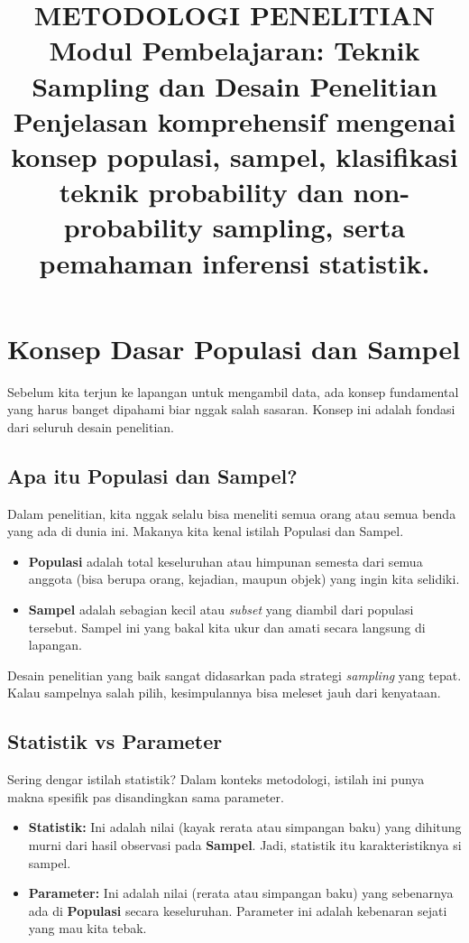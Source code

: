 \documentclass[12pt,a4paper]{article}
\title{
  {\LARGE\bfseries METODOLOGI PENELITIAN}\\[0.5em]
  {\large Modul Pembelajaran: Teknik Sampling dan Desain Penelitian}\\[0.8em]
  {\normalsize Penjelasan komprehensif mengenai konsep populasi, sampel, klasifikasi teknik probability dan non-probability sampling, serta pemahaman inferensi statistik.}
}
\author{}
\date{}
\begin{document}
\maketitle
\thispagestyle{fancy}
\tableofcontents
\newpage


\section{Konsep Dasar Populasi dan Sampel}

Sebelum kita terjun ke lapangan untuk mengambil data, ada konsep fundamental yang harus banget dipahami biar nggak salah sasaran. Konsep ini adalah fondasi dari seluruh desain penelitian.

\subsection{Apa itu Populasi dan Sampel?}
Dalam penelitian, kita nggak selalu bisa meneliti semua orang atau semua benda yang ada di dunia ini. Makanya kita kenal istilah Populasi dan Sampel.
\begin{itemize}
    \item \textbf{Populasi} adalah total keseluruhan atau himpunan semesta dari semua anggota (bisa berupa orang, kejadian, maupun objek) yang ingin kita selidiki.
    \item \textbf{Sampel} adalah sebagian kecil atau \textit{subset} yang diambil dari populasi tersebut. Sampel ini yang bakal kita ukur dan amati secara langsung di lapangan.
\end{itemize}
Desain penelitian yang baik sangat didasarkan pada strategi \textit{sampling} yang tepat. Kalau sampelnya salah pilih, kesimpulannya bisa meleset jauh dari kenyataan.

\subsection{Statistik vs Parameter}
Sering dengar istilah statistik? Dalam konteks metodologi, istilah ini punya makna spesifik pas disandingkan sama parameter.
\begin{itemize}
    \item \textbf{Statistik:} Ini adalah nilai (kayak rerata atau simpangan baku) yang dihitung murni dari hasil observasi pada \textbf{Sampel}. Jadi, statistik itu karakteristiknya si sampel.
    \item \textbf{Parameter:} Ini adalah nilai (rerata atau simpangan baku) yang sebenarnya ada di \textbf{Populasi} secara keseluruhan. Parameter ini adalah kebenaran sejati yang mau kita tebak.
\end{itemize}
\end{document}
